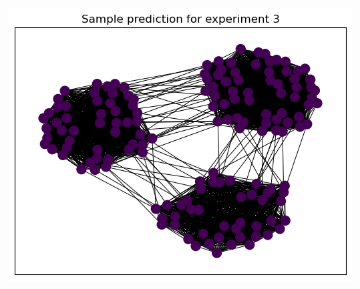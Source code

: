 \documentclass[switch, 12pt]{article}
\begin{document}
\begin{figure}[h]
\begin{subfigure}{0.28\linewidth}
        \includegraphics[width=\linewidth]{figures/exp3_pred.png}
    \end{subfigure}
    \hfill

    \medskip


\end{figure}
\end{document}
